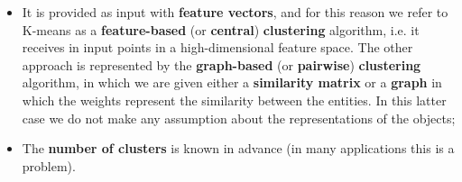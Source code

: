 \begin{itemize}
    \item It is provided as input with \textbf{feature vectors}, and for this reason we refer to K-means as a \textbf{feature-based} (or \textbf{central}) \textbf{clustering} algorithm, i.e. it receives in input points in a high-dimensional feature space. The other approach is represented by the \textbf{graph-based} (or \textbf{pairwise}) \textbf{clustering} algorithm, in which we are given either a \textbf{similarity matrix} or a \textbf{graph} in which the weights represent the similarity between the entities. In this latter case we do not make any assumption about the representations of the objects;
    \item The \textbf{number of clusters} is known in advance (in many applications this is a problem).
\end{itemize}

